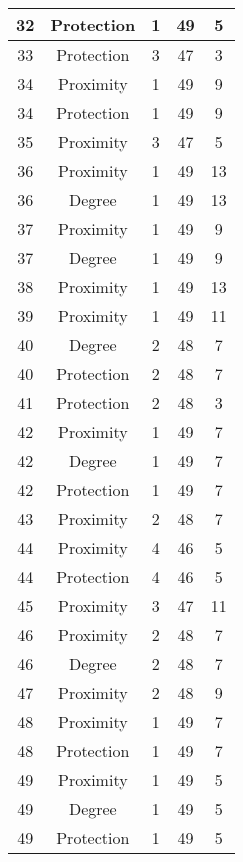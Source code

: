 \documentclass[results.tex]{subfiles}
\begin{document}
\begin{center}
\begin{tabular}{| c || c | c | c | c |}
    \hline
    32 & Protection & 1 & 49 & 5 \\ 
    \hline
    33 & Protection & 3 & 47 & 3 \\ 
    \hline
    34 & Proximity & 1 & 49 & 9 \\ 
    \hline
    34 & Protection & 1 & 49 & 9 \\ 
    \hline
    35 & Proximity & 3 & 47 & 5 \\ 
    \hline
    36 & Proximity & 1 & 49 & 13 \\ 
    \hline
    36 & Degree & 1 & 49 & 13 \\ 
    \hline
    37 & Proximity & 1 & 49 & 9 \\ 
    \hline
    37 & Degree & 1 & 49 & 9 \\ 
    \hline
    38 & Proximity & 1 & 49 & 13 \\ 
    \hline
    39 & Proximity & 1 & 49 & 11 \\ 
    \hline
    40 & Degree & 2 & 48 & 7 \\ 
    \hline
    40 & Protection & 2 & 48 & 7 \\ 
    \hline
    41 & Protection & 2 & 48 & 3 \\ 
    \hline
    42 & Proximity & 1 & 49 & 7 \\ 
    \hline
    42 & Degree & 1 & 49 & 7 \\ 
    \hline
    42 & Protection & 1 & 49 & 7 \\ 
    \hline
    43 & Proximity & 2 & 48 & 7 \\ 
    \hline
    44 & Proximity & 4 & 46 & 5 \\ 
    \hline
    44 & Protection & 4 & 46 & 5 \\ 
    \hline
    45 & Proximity & 3 & 47 & 11 \\ 
    \hline
    46 & Proximity & 2 & 48 & 7 \\ 
    \hline
    46 & Degree & 2 & 48 & 7 \\ 
    \hline
    47 & Proximity & 2 & 48 & 9 \\ 
    \hline
    48 & Proximity & 1 & 49 & 7 \\ 
    \hline
    48 & Protection & 1 & 49 & 7 \\ 
    \hline
    49 & Proximity & 1 & 49 & 5 \\ 
    \hline
    49 & Degree & 1 & 49 & 5 \\ 
    \hline
    49 & Protection & 1 & 49 & 5 \\ 
    \hline   \end{tabular}
\end{center}
\end{document}
